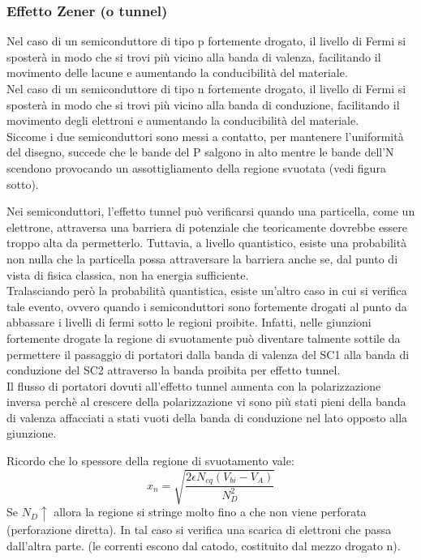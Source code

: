 \subsubsection{Effetto Zener (o tunnel)}
%
\begin{ripasso}
    Nel caso di un semiconduttore di tipo p fortemente drogato, il livello di Fermi si sposterà in modo che si trovi più vicino alla banda di valenza, facilitando il movimento delle lacune e aumentando la conducibilità del materiale.\\
    Nel caso di un semiconduttore di tipo n fortemente drogato, il livello di Fermi si sposterà in modo che si trovi più vicino alla banda di conduzione, facilitando il movimento degli elettroni e aumentando la conducibilità del materiale.\\
    Siccome i due semiconduttori sono messi a contatto, per mantenere l'uniformità  del disegno, succede che le bande del P salgono in alto mentre le bande dell'N scendono provocando un assottigliamento della regione svuotata (vedi figura sotto).
\end{ripasso}
%
 Nei semiconduttori, l'effetto tunnel può verificarsi quando una particella, come un elettrone, attraversa una barriera di potenziale che teoricamente dovrebbe essere troppo alta da permetterlo. Tuttavia, a livello quantistico, esiste una probabilità non nulla che la particella possa attraversare la barriera anche se, dal punto di vista di fisica classica, non ha energia sufficiente.\\
 
Tralasciando però la probabilità quantistica, esiste un'altro caso in cui si verifica tale evento, ovvero quando i semiconduttori sono fortemente drogati al punto da abbassare i livelli di fermi sotto le regioni proibite.
Infatti, nelle giunzioni fortemente drogate la regione di svuotamente può diventare talmente sottile da permettere il passaggio di portatori dalla banda di valenza del SC1 alla banda di conduzione del SC2 attraverso la banda proibita per effetto tunnel.\\

Il flusso di portatori dovuti all'effetto tunnel aumenta con la polarizzazione inversa perchè al crescere della polarizzazione vi sono più stati pieni della banda di valenza affacciati a stati vuoti della banda di conduzione nel lato opposto alla giunzione.

Ricordo che lo spessore della regione di svuotamento vale:
%
\begin{equation}
    x_n= \sqrt{\dfrac{2\epsilon N_{eq}(V_{bi}-V_A)}{N_D^2}}
\end{equation}
%
Se $N_D \uparrow$ allora la regione si stringe molto fino a che non viene perforata (perforazione diretta). In tal caso si verifica una scarica di elettroni che passa dall'altra parte. (le correnti escono dal catodo, costituito dal mezzo drogato n).


